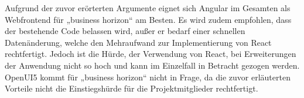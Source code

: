 Aufgrund der zuvor erörterten Argumente eignet sich Angular im Gesamten als Webfrontend für „business horizon“ am Besten. Es wird zudem empfohlen, dass der bestehende Code belassen wird, außer er bedarf einer schnellen Datenänderung, welche den Mehraufwand zur Implementierung von React rechtfertigt. Jedoch ist die Hürde, der Verwendung von React, bei Erweiterungen der Anwendung nicht so hoch und kann im Einzelfall in Betracht gezogen werden. OpenUI5 kommt für „business horizon“ nicht in Frage, da die zuvor erläuterten Vorteile nicht die Einstiegshürde für die Projektmitglieder rechtfertigt.



